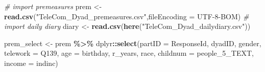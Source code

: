 \documentclass[
]{article}
\newenvironment{Shaded}{\begin{snugshade}}{\end{snugshade}}
\newcommand{\CommentTok}[1]{\textcolor[rgb]{0.56,0.35,0.01}{\textit{#1}}}
\newcommand{\DataTypeTok}[1]{\textcolor[rgb]{0.13,0.29,0.53}{#1}}
\newcommand{\DecValTok}[1]{\textcolor[rgb]{0.00,0.00,0.81}{#1}}
\newcommand{\KeywordTok}[1]{\textcolor[rgb]{0.13,0.29,0.53}{\textbf{#1}}}
\newcommand{\NormalTok}[1]{#1}
\newcommand{\OperatorTok}[1]{\textcolor[rgb]{0.81,0.36,0.00}{\textbf{#1}}}
\newcommand{\StringTok}[1]{\textcolor[rgb]{0.31,0.60,0.02}{#1}}
\begin{document}
\begin{table}[ ht ]
\begin{tabular}{ l c c c }
\end{tabular}
\end{table}

\begin{Shaded}
\begin{Highlighting}[]
\CommentTok{\# import premeasures}
\NormalTok{prem \textless{}{-}}\StringTok{ }\KeywordTok{read.csv}\NormalTok{(}\StringTok{"TeleCom\_Dyad\_premeasures.csv"}\NormalTok{,}\DataTypeTok{fileEncoding =} \StringTok{\textquotesingle{}UTF{-}8{-}BOM\textquotesingle{}}\NormalTok{)}
\CommentTok{\# import daily diary}
\NormalTok{diary \textless{}{-}}\StringTok{ }\KeywordTok{read.csv}\NormalTok{(}\KeywordTok{here}\NormalTok{(}\StringTok{"TeleCom\_Dyad\_dailydiary.csv"}\NormalTok{))}
\end{Highlighting}
\end{Shaded}

\begin{Shaded}
\end{Shaded}

\begin{Shaded}
\begin{Highlighting}[]
\NormalTok{prem\_select \textless{}{-}}\StringTok{ }\NormalTok{prem }\OperatorTok{\%\textgreater{}\%}
\StringTok{  }\NormalTok{dplyr}\OperatorTok{::}\KeywordTok{select}\NormalTok{(}\DataTypeTok{partID =}\NormalTok{ ResponseId, dyadID, gender, }\DataTypeTok{telework =}\NormalTok{ Q139, }\DataTypeTok{age =}\NormalTok{ birthday, r\_years, race, }\DataTypeTok{childnum =}\NormalTok{ people\_}\DecValTok{5}\NormalTok{\_TEXT, }\DataTypeTok{income =}\NormalTok{ indinc)}
\end{Highlighting}
\end{Shaded}
\end{document}
